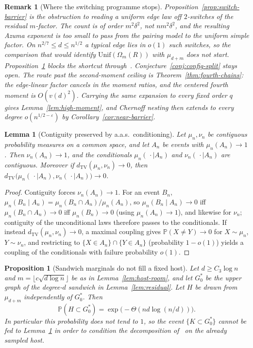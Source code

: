 \documentclass[11pt]{article}
\newtheorem{lemma}[theorem]{Lemma}
\newtheorem{proposition}[theorem]{Proposition}
\newtheorem{remark}[theorem]{Remark}
\newcommand{\PP}{\mathbb{P}}
\newcommand{\dTV}{d_{\mathrm{TV}}}
\begin{document}
\begin{remark}[Where the switching programme stops]
\label{rem:quasi-regular}
Proposition~\ref{prop:switch-barrier} is the obstruction to reading a uniform edge
law off \(2\)-switches of the residual \(m\)-factor.
The count is of order \(m^2\delta^2\), not \(nm^2\delta^2\), and the resulting
Azuma exponent is too small to pass from the pairing model to the uniform simple
factor.
On \(n^{2/7}\le d\le n^{1/2}\) a typical edge lies in \(o(1)\) such switches, so the
comparison that would identify \(\mathrm{Unif}(\Omega_m(R))\) with \(\mu_{d+m}\) does not
start.
Proposition~\ref{prop:host-gap} blocks the shortcut through~\cite[(1.1)]{CFG25}.
Conjecture~\ref{conj:config-split} stays open.
The route past the second-moment ceiling is Theorem~\ref{thm:fourth-chains}:
the edge-linear factor cancels in the moment ratios, and the centered fourth
moment is \(O(v(d)^2)\). Carrying the same expansion to every fixed order
\(q\) gives Lemma~\ref{lem:high-moment}, and Chernoff nesting then extends to
every degree \(o(n^{1/2-\varepsilon})\) by Corollary~\ref{cor:near-barrier}.
\end{remark}

\begin{lemma}[Contiguity preserved by a.a.s.\ conditioning]
\label{lem:cond-contiguity}
Let \(\mu_n,\nu_n\) be contiguous probability measures on a common space, and let
\(A_n\) be events with \(\mu_n(A_n)\to 1\). Then \(\nu_n(A_n)\to 1\), and the
conditionals \(\mu_n(\,\cdot\mid A_n)\) and \(\nu_n(\,\cdot\mid A_n)\) are contiguous.
Moreover if \(\dTV(\mu_n,\nu_n)\to 0\), then
\(\dTV\bigl(\mu_n(\,\cdot\mid A_n),\nu_n(\,\cdot\mid A_n)\bigr)\to 0\).
\end{lemma}

\begin{proof}
Contiguity forces \(\nu_n(A_n)\to 1\). For an event \(B_n\),
\(\mu_n(B_n\mid A_n)=\mu_n(B_n\cap A_n)/\mu_n(A_n)\), so
\(\mu_n(B_n\mid A_n)\to 0\) iff \(\mu_n(B_n\cap A_n)\to 0\) iff \(\mu_n(B_n)\to 0\)
(using \(\mu_n(A_n)\to 1\)), and likewise for \(\nu_n\); contiguity of the
unconditional laws therefore passes to the conditionals.
If instead \(\dTV(\mu_n,\nu_n)\to 0\), a maximal coupling gives
\(\PP(X\neq Y)\to 0\) for \(X\sim\mu_n\), \(Y\sim\nu_n\), and restricting to
\(\{X\in A_n\}\cap\{Y\in A_n\}\) (probability \(1-o(1)\)) yields a coupling of the
conditionals with failure probability \(o(1)\).
\end{proof}

\begin{proposition}[Sandwich marginals do not fill a fixed host]
\label{prop:host-gap}
Let \(d\ge C_3\log n\) and \(m=\lfloor c\sqrt{d\log n}\rfloor\) be as in
Lemma~\ref{lem:host-room}, and let \(G^*_0\) be the upper graph of the degree-\(d\)
sandwich in Lemma~\ref{lem:residual}.
Let \(H\) be drawn from \(\mu_{d+m}\) independently of \(G^*_0\).
Then
\[
\PP(H\subset G^*_0)=\exp\bigl(-\Theta(nd\log(n/d))\bigr).
\]
In particular this probability does not tend to \(1\), so the event
\(\{K\subset G^*_0\}\) cannot be fed to Lemma~\ref{lem:cond-contiguity} in order to
condition the decomposition of~\cite[(1.1)]{CFG25} on the already sampled host.
\end{proposition}
\end{document}
